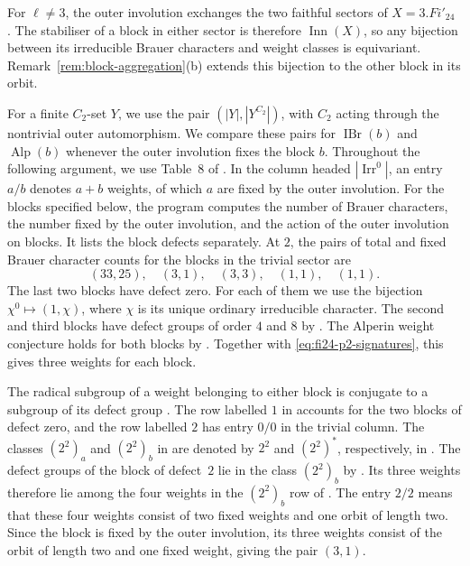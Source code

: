\documentclass[10pt]{amsart}
\theoremstyle{definition}
\let\oldendproof\endproof
\renewenvironment{proof}[1][\proofname]{%
  \oldproof[\bfseries #1]%
}{\oldendproof}
\DeclareMathOperator{\Inn}{Inn}
\DeclareMathOperator{\IBr}{IBr}
\DeclareMathOperator{\Irr}{Irr}
\DeclareMathOperator{\Alp}{Alp}
\numberwithin{equation}{section}
\numberwithin{table}{section}
\begin{document}
\begin{proof}
For $\ell\neq3$, the outer involution exchanges the two faithful sectors
of $X=3.Fi'_{24}$ \cite[Lemma~4.7]{AnDietrich2012}. The stabiliser of a
block in either sector is therefore $\Inn(X)$, so any bijection between
its irreducible Brauer characters and weight classes is equivariant.
Remark~\ref{rem:block-aggregation}\textup{(b)} extends this bijection to the other
block in its orbit.

For a finite $C_2$-set $Y$, we use the pair $(|Y|,|Y^{C_2}|)$, with
$C_2$ acting through the nontrivial outer automorphism. We compare
these pairs for $\IBr(b)$ and $\Alp(b)$ whenever the outer involution
fixes the block $b$.
Throughout the following argument, we use Table~8 of
\cite{AnDietrich2012}. In the column headed $|\Irr^0|$, an entry $a/b$
denotes $a+b$ weights, of which $a$ are fixed by the outer involution.  For
the blocks specified below, the program
 computes the number of Brauer characters, the number
fixed by the outer involution, and the action of the outer involution on blocks.  It
lists the block defects separately.  At $2$,
the pairs of total and fixed Brauer character counts for the blocks
in the trivial sector are
\begin{equation}\label{eq:fi24-p2-signatures}
 (33,25),\quad(3,1),\quad(3,3),\quad(1,1),\quad(1,1).
\end{equation}
The last two blocks have defect zero. For each of them we use the
bijection $\chi^0\mapsto(1,\chi)$, where $\chi$ is its unique ordinary
irreducible character. The second and third blocks have defect
groups of order $4$ and $8$ by
\cite[Lemma~4.2(d)]{AnCannonOBrienUngerFi24}.
The Alperin weight conjecture holds for both blocks by
\cite[Theorem~13.7]{Sambale2014}. Together with
\eqref{eq:fi24-p2-signatures}, this gives three weights for each block.

The radical subgroup of a weight belonging to either block is conjugate
to a subgroup of its defect group \cite[Theorem~4.14]{Navarro1998}.
The row labelled $1$ in \cite[Table~8]{AnDietrich2012} accounts for
the two blocks of defect zero, and the row labelled $2$ has entry $0/0$
in the trivial column.
The classes $(2^2)_a$ and $(2^2)_b$ in
\cite[Table~8]{AnDietrich2012} are denoted by $2^2$ and $(2^2)^*$,
respectively, in \cite[Table~2]{AnCannonOBrienUngerFi24}.
The defect groups of the block of defect~$2$ lie in the class $(2^2)_b$
by \cite[Lemma~4.2(d)]{AnCannonOBrienUngerFi24}.
Its three weights therefore lie among the four weights in the
$(2^2)_b$ row of \cite[Table~8]{AnDietrich2012}.
The entry $2/2$ means that these four weights consist of two fixed
weights and one orbit of length two. Since the block is fixed by the outer
involution, its three weights consist of the orbit of length two and one
fixed weight, giving the pair $(3,1)$.


\end{proof}
\end{document}
